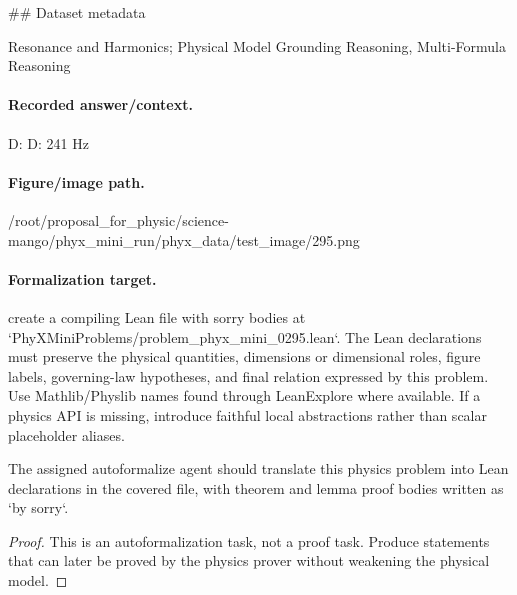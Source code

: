 \#\# Dataset metadata

Resonance and Harmonics; Physical Model Grounding Reasoning, Multi-Formula Reasoning

\paragraph{Recorded answer/context.}
D: D: 241 Hz

\paragraph{Figure/image path.}
/root/proposal\_for\_physic/science-mango/phyx\_mini\_run/phyx\_data/test\_image/295.png

\paragraph{Formalization target.}
create a compiling Lean file with sorry bodies at `PhyXMiniProblems/problem\_phyx\_mini\_0295.lean`. The Lean declarations must preserve the physical quantities, dimensions or dimensional roles, figure labels, governing-law hypotheses, and final relation expressed by this problem.
Use Mathlib/Physlib names found through LeanExplore where available. If a physics API is missing, introduce faithful local abstractions rather than scalar placeholder aliases.

\begin{theorem}
\label{thm:physics:phyx_mini_0295:target}
The assigned autoformalize agent should translate this physics problem into Lean declarations in the covered file, with theorem and lemma proof bodies written as `by sorry`.
\end{theorem}
\begin{proof}
This is an autoformalization task, not a proof task. Produce statements that can later be proved by the physics prover without weakening the physical model.
\end{proof}

